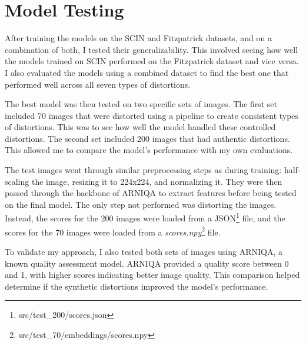 \section{Model Testing}
\label{sec:ModelTesting}
After training the models on the SCIN and Fitzpatrick datasets, and on a combination of both, I tested their generalizability. This involved seeing how well the models trained on SCIN performed on the Fitzpatrick dataset and vice versa. I also evaluated the models using a combined dataset to find the best one that performed well across all seven types of distortions. \par
\vspace{\baselineskip}
\noindent
The best model was then tested on two specific sets of images. The first set included 70 images that were distorted using a pipeline to create consistent types of distortions. This was to see how well the model handled these controlled distortions. The second set included 200 images that had authentic distortions. This allowed me to compare the model’s performance with my own evaluations. \par
\vspace{\baselineskip}
\noindent
The test images went through similar preprocessing steps as during training: half-scaling the image, resizing it to 224x224, and normalizing it. They were then passed through the backbone of ARNIQA to extract features before being tested on the final model. The only step not performed was distorting the images. Instead, the scores for the 200 images were loaded from a JSON\footnote{src/test\_200/scores.json} file, and the scores for the 70 images were loaded from a \textit{scores.npy}\footnote{src/test\_70/embeddings/scores.npy} file. \par
\vspace{\baselineskip}
\noindent
To validate my approach, I also tested both sets of images using ARNIQA, a known quality assessment model. ARNIQA provided a quality score between 0 and 1, with higher scores indicating better image quality. This comparison helped determine if the synthetic distortions improved the model’s performance. \par
